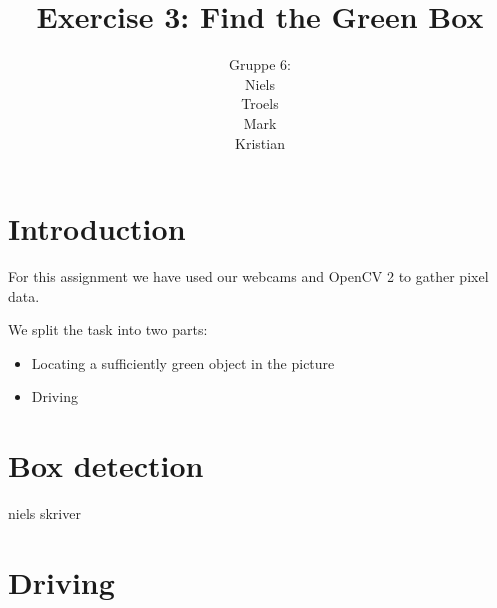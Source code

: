 \documentclass[a4paper,12pt]{article}
\title{Exercise 3: Find the Green Box}
\author{Gruppe 6:\\Niels\\Troels\\Mark\\Kristian}
\begin{document}
\maketitle

\section{Introduction}

For this assignment we have used our webcams and OpenCV 2 to gather pixel data.

We split the task into two parts:

\begin{itemize}
\item Locating a sufficiently green object in the picture
\item Driving
\end{itemize}


\section{Box detection}

niels skriver


\section{Driving}
\end{document}
